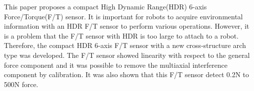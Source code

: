 This paper proposes a compact High Dynamic Range(HDR) 6-axis Force/Torque(F/T) sensor.
It is important for robots to acquire environmental information with an HDR F/T sensor to perform various operations.
However, it is a problem that the F/T sensor with HDR is too large to attach to a robot.
Therefore, the compact HDR 6-axis F/T sensor with a new cross-structure arch type was developed.
The F/T sensor showed linearity with respect to the general force component and it was possible to remove the multiaxial interference component by calibration.
It was also shown that this F/T sensor  detect 0.2N to 500N force.

